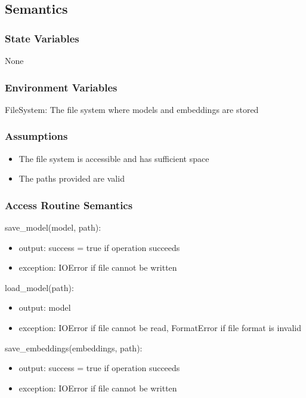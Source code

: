\documentclass[12pt, titlepage]{article}
\begin{document}
\subsection{Semantics}

\subsubsection{State Variables}
None

\subsubsection{Environment Variables}

FileSystem: The file system where models and embeddings are stored

\subsubsection{Assumptions}

\begin{itemize}
  \item The file system is accessible and has sufficient space
  \item The paths provided are valid
\end{itemize}

\subsubsection{Access Routine Semantics}

\noindent save\_model(model, path):
\begin{itemize}
\item output:  success = true if operation succeeds
\item exception: IOError if file cannot be written
\end{itemize}

\noindent load\_model(path):
\begin{itemize}
\item output: model
\item exception: IOError if file cannot be read, FormatError if file format is invalid
\end{itemize}

\noindent save\_embeddings(embeddings, path):
\begin{itemize}
\item output: success = true if operation succeeds
\item exception: IOError if file cannot be written
\end{itemize}
\end{document}
